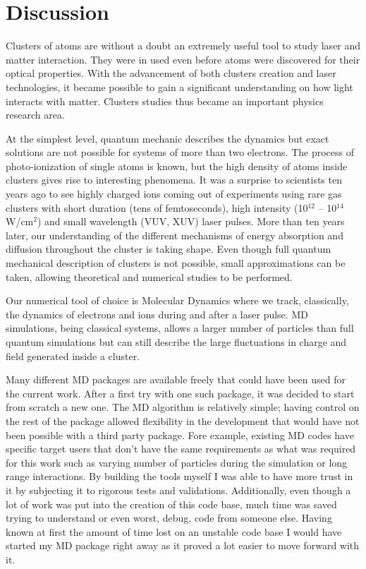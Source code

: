 \section{Discussion}

Clusters of atoms are without a doubt an extremely useful tool to study
laser and matter interaction. They were in used even before atoms were discovered
for their optical properties. With the advancement of both clusters creation
and laser technologies, it became possible to gain a significant understanding
on how light interacts with matter. Clusters studies thus became an important
physics research area.

At the simplest level, quantum mechanic describes the dynamics but exact solutions
are not possible for systems of more than two electrons.
The process of photo-ionization of single atoms is known, but the high density
of atoms inside clusters gives rise to interesting phenomena. It was a surprise
to scientists ten years ago to see highly charged ions coming out of experiments
using rare gas clusters with short duration (tens of femtoseconds), high intensity
(10$^{12}$ -- 10$^{14}$ W/cm$^2$) and small wavelength (VUV, XUV) laser pulses.
More than ten years later, our understanding of the different mechanisms of energy
absorption and diffusion throughout the cluster is taking shape. Even though full
quantum mechanical description of clusters is not possible, small approximations
can be taken, allowing theoretical and numerical studies to be performed.

Our numerical tool of choice is Molecular Dynamics where we track, classically,
the dynamics of electrons and ions during and after a laser pulse. MD simulations,
being classical systems, allows a larger number of particles than full quantum
simulations but can still describe the large fluctuations in charge and field
generated inside a cluster.

Many different MD packages are available freely that could have been used for
the current work. After a first try with one such package, it was decided to
start from scratch a new one. The MD algorithm is relatively simple; having
control on the rest of the package allowed flexibility in the development that
would have not been possible with a third party package. Fore example, existing
MD codes have specific target users that don't have the same requirements as what
was required for this work such as varying number of particles during the
simulation or long range interactions. By building the tools myself I was able
to have more trust in it by subjecting it to rigorous tests and validations.
Additionally, even though a lot of work was put into the creation of this code
base, much time was saved trying to understand or even worst, debug, code from
someone else. Having known at first the amount of time lost on an unstable code
base I would have started my MD package right away as it proved a lot easier
to move forward with it.


